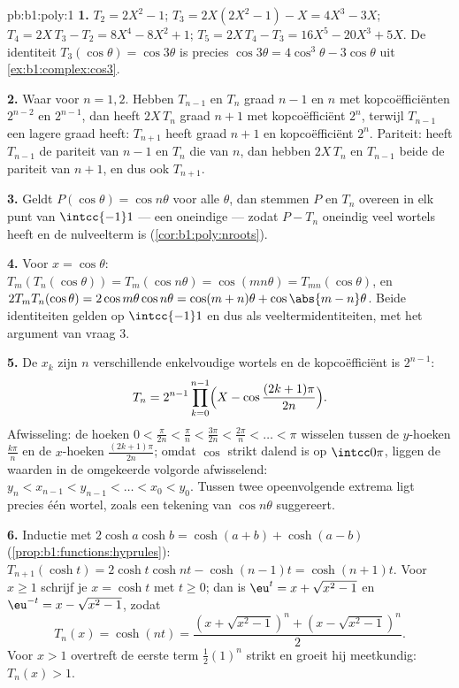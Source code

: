 \begin{solution}{pb:b1:poly:1}
\textbf{1.} $T_2 = 2X^2 - 1$; $T_3 = 2X(2X^2 - 1) - X = 4X^3 - 3X$; $T_4
= 2X\,T_3 - T_2 = 8X^4 - 8X^2 + 1$; $T_5 = 2X\,T_4 - T_3 = 16X^5 - 20X^3
+ 5X$. De identiteit $T_3(\cos\theta) = \cos3\theta$ is precies
$\cos3\theta = 4\cos^3\theta - 3\cos\theta$ uit
\cref{ex:b1:complex:cos3}.

\textbf{2.} Waar voor $n = 1, 2$. Hebben $T_{n-1}$ en $T_n$ graad $n-1$
en $n$ met kopcoëfficiënten $2^{n-2}$ en $2^{n-1}$, dan heeft $2X\,T_n$
graad $n+1$ met kopcoëfficiënt $2^n$, terwijl $T_{n-1}$ een lagere graad
heeft: $T_{n+1}$ heeft graad $n + 1$ en kopcoëfficiënt $2^n$. Pariteit:
heeft $T_{n-1}$ de pariteit van $n - 1$ en $T_n$ die van $n$, dan hebben
$2X\,T_n$ en $T_{n-1}$ beide de pariteit van $n + 1$, en dus ook
$T_{n+1}$.

\textbf{3.} Geldt $P(\cos\theta) = \cos n\theta$ voor alle $\theta$, dan
stemmen $P$ en $T_n$ overeen in elk punt van $\intcc{-1}1$ --- een
oneindige  --- zodat $P - T_n$ oneindig veel wortels heeft en
de nulveelterm is (\cref{cor:b1:poly:nroots}).

\textbf{4.} Voor $x = \cos\theta$: $T_m(T_n(\cos\theta)) = T_m(\cos
n\theta) = \cos(mn\theta) = T_{mn}(\cos\theta)$, en $2T_mT_n(\cos\theta)
= 2\cos m\theta\cos n\theta = \cos(m+n)\theta + \cos\abs{m -
n}\theta$. Beide identiteiten gelden op $\intcc{-1}1$ en dus als
veeltermidentiteiten, met het argument van vraag 3.

\textbf{5.} De $x_k$ zijn $n$ verschillende enkelvoudige wortels en de
kopcoëfficiënt is $2^{n-1}$:
\[
T_n = 2^{n-1}\prod_{k=0}^{n-1}
\Bigl(X - \cos\frac{(2k+1)\pi}{2n}\Bigr) .
\]
Afwisseling: de hoeken $0 < \frac{\pi}{2n} < \frac\pi n <
\frac{3\pi}{2n} < \frac{2\pi}n < \dots < \pi$ wisselen tussen de
$y$-hoeken $\frac{k\pi}n$ en de $x$-hoeken $\frac{(2k+1)\pi}{2n}$; omdat
$\cos$ strikt dalend is op $\intcc0\pi$, liggen de waarden in de
omgekeerde volgorde afwisselend: $y_n < x_{n-1} < y_{n-1} < \dots < x_0 <
y_0$. Tussen twee opeenvolgende extrema ligt precies één wortel, zoals
een tekening van $\cos n\theta$ suggereert.

\textbf{6.} Inductie met $2\cosh a\cosh b = \cosh(a + b) + \cosh(a - b)$
(\cref{prop:b1:functions:hyprules}): $T_{n+1}(\cosh t) = 2\cosh t\cosh nt
- \cosh(n-1)t = \cosh(n+1)t$. Voor $x \geq 1$ schrijf je $x = \cosh t$
met $t \geq 0$; dan is $\eu^t = x + \sqrt{x^2 - 1}$ en $\eu^{-t} = x -
\sqrt{x^2 - 1}$, zodat
\[
T_n(x) = \cosh(nt)
= \frac{(x + \sqrt{x^2-1})^n + (x - \sqrt{x^2-1})^n}2 .
\]
Voor $x > 1$ overtreft de eerste term $\frac12(1)^n$ strikt en groeit hij
meetkundig: $T_n(x) > 1$.


\end{solution}
